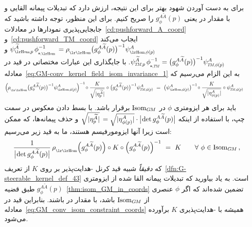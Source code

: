 برای به دست آوردن شهود بهتر برای این نتیجه، ارزش دارد که تبدیلات پیمانه القایی و با مقدار در  یعنی $g_\phi^{A\widetilde{A}}(p)$ را صریح کنیم.
برای این منظور، توجه داشته باشید که جابجایی‌پذیری نمودارها در معادلات~\eqref{cd:pushforward_A_coord} و~\eqref{cd:pushforward_TM_coord} ایجاب می‌کند
$\psiHomp^{\widetilde{A}}\, \dphiHominv = \rhoHom\big( g_\phi^{A\widetilde{A}}(p) \big)^{-1} \psiHomphip^A$ و
$\psiTMp^{\widetilde{A}}\,  \dphiTMinv  =         \big( g_\phi^{A\widetilde{A}}(p) \big)^{-1} \psiTMphip^A$.
با جایگذاری این عبارات مختصاتی در قید در معادله~\eqref{eq:GM-conv_kernel_field_isom_invariance_1} به این الزام می‌رسیم که
\begin{align}\label{eq:GM-conv_kernel_field_isom_invariance_2}
    \Big(\mkern-1.5mu \rhoHom\big( g_\phi^{A\widetilde{A}}(p) \big)^{-1} \psiHomphip^A \mkern-1.5mu\Big)^{-1}
    \!\circ \frac{K}{\sqrt{|\eta_p^{\widetilde{A}}|}} \circ \big( g_\phi^{A\widetilde{A}}(p) \big)^{-1} \psiTMphip^A
    \ &=\ \big(\psiHomphip^A \big)^{-1} \!\circ \frac{K}{\sqrt{|\eta_{\phi(p)}^A|}} \circ \psiTMphip^A
\end{align}
باید برای هر ایزومتری $\phi$ در $\operatorname{Isom}_{G\mkern-1.4muM}$ برقرار باشد.
با بسط دادن معکوس در سمت چپ، با استفاده از اینکه
${\sqrt{|\eta_p^{\widetilde{A}}|} \,= \sqrt{|\eta_{\phi(p)}^A|} \cdot \big|\mkern-2mu \det g^{A\widetilde{A}}_\phi(p) \big|}$
و حذف پیمانه‌ها، که ممکن است زیرا آنها ایزومورفیسم هستند، ما به قید زیر می‌رسیم:
\begin{align}\label{eq:GM_conv_isom_constraint_coords}
    \frac{1}{\big|\mkern-2mu \det g^{A\widetilde{A}}_\phi(p) \big|} \,
    \rhoHom\Big(g^{A\widetilde{A}}_\phi(p)\Big) \circ K \circ \Big(g^{A\widetilde{A}}_\phi(p)\Big)^{-1} \ =\ K
    \qquad \forall\ \phi \in \IsomGM \,,
\end{align}
که \emph{دقیقاً} شبیه قید کرنل -هدایت‌پذیر بر روی $K$ از تعریف~\ref{dfn:G-steerable_kernel_def_43} است.
به یاد بیاورید که تبدیلات پیمانه القا شده از ایزومتری $g_\phi^{A\widetilde{A}}(p)$ طبق قضیه~\ref{thm:isom_GM_in_coords} تضمین شده‌اند که اگر $\phi$ عنصری از $\operatorname{Isom}_{G\mkern-1.4muM}$ باشد، با مقدار در  باشند.
بنابراین قید در معادله~\eqref{eq:GM_conv_isom_constraint_coords} همیشه با -هدایت‌پذیری $K$ برآورده می‌شود.

